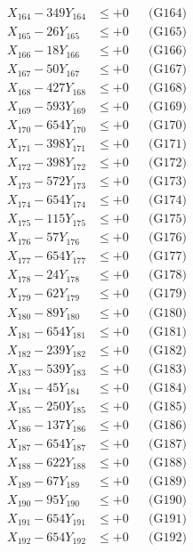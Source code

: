 \documentclass[a4paper,10pt]{article}
\begin{document}
{\begin{align}
X_{164} - 349Y_{164} &\leq +0 && \text{(G164)} \\
X_{165} - 26Y_{165} &\leq +0 && \text{(G165)} \\
X_{166} - 18Y_{166} &\leq +0 && \text{(G166)} \\
X_{167} - 50Y_{167} &\leq +0 && \text{(G167)} \\
X_{168} - 427Y_{168} &\leq +0 && \text{(G168)} \\
X_{169} - 593Y_{169} &\leq +0 && \text{(G169)} \\
X_{170} - 654Y_{170} &\leq +0 && \text{(G170)} \\
\allowbreak
X_{171} - 398Y_{171} &\leq +0 && \text{(G171)} \\
X_{172} - 398Y_{172} &\leq +0 && \text{(G172)} \\
X_{173} - 572Y_{173} &\leq +0 && \text{(G173)} \\
X_{174} - 654Y_{174} &\leq +0 && \text{(G174)} \\
X_{175} - 115Y_{175} &\leq +0 && \text{(G175)} \\
X_{176} - 57Y_{176} &\leq +0 && \text{(G176)} \\
X_{177} - 654Y_{177} &\leq +0 && \text{(G177)} \\
X_{178} - 24Y_{178} &\leq +0 && \text{(G178)} \\
X_{179} - 62Y_{179} &\leq +0 && \text{(G179)} \\
X_{180} - 89Y_{180} &\leq +0 && \text{(G180)} \\
\allowbreak
X_{181} - 654Y_{181} &\leq +0 && \text{(G181)} \\
X_{182} - 239Y_{182} &\leq +0 && \text{(G182)} \\
X_{183} - 539Y_{183} &\leq +0 && \text{(G183)} \\
X_{184} - 45Y_{184} &\leq +0 && \text{(G184)} \\
X_{185} - 250Y_{185} &\leq +0 && \text{(G185)} \\
X_{186} - 137Y_{186} &\leq +0 && \text{(G186)} \\
X_{187} - 654Y_{187} &\leq +0 && \text{(G187)} \\
X_{188} - 622Y_{188} &\leq +0 && \text{(G188)} \\
X_{189} - 67Y_{189} &\leq +0 && \text{(G189)} \\
X_{190} - 95Y_{190} &\leq +0 && \text{(G190)} \\
\allowbreak
X_{191} - 654Y_{191} &\leq +0 && \text{(G191)} \\
X_{192} - 654Y_{192} &\leq +0 && \text{(G192)} \\

\end{align}}
\end{document}
